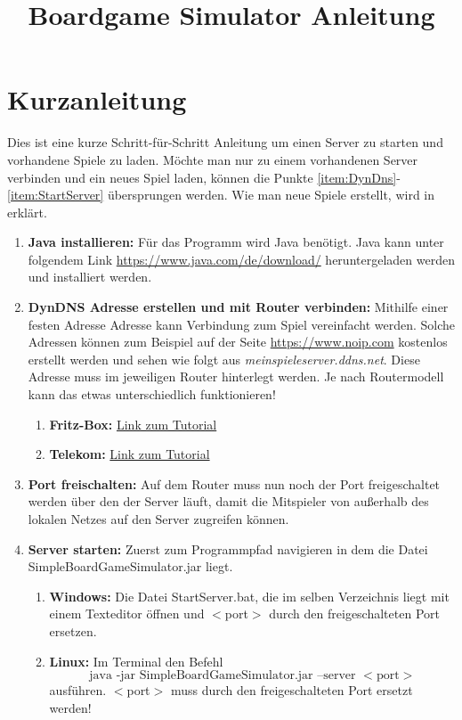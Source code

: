 \documentclass[ngerman]{scrbook}
\title{Boardgame Simulator Anleitung}
\begin{document}
	\maketitle
	\tableofcontents
	\chapter{Kurzanleitung}
	
	Dies ist eine kurze Schritt-für-Schritt Anleitung um einen Server zu starten und vorhandene Spiele zu laden. Möchte man nur zu einem vorhandenen Server verbinden und ein neues Spiel laden, können die Punkte \ref{item:DynDns}-\ref{item:StartServer} übersprungen werden. Wie man neue Spiele erstellt, wird in  erklärt.
	
	\begin{enumerate}[label=\arabic*)]
		\item \textbf{Java installieren:} Für das Programm wird Java benötigt. Java kann unter folgendem Link \href{https://www.java.com/de/download/}{https://www.java.com/de/download/} heruntergeladen werden und installiert werden.
		
		\item \label{item:DynDns} \textbf{DynDNS Adresse erstellen und mit Router verbinden:} Mithilfe einer festen Adresse Adresse kann Verbindung zum Spiel vereinfacht werden. Solche Adressen können zum Beispiel auf der Seite \href{https://www.noip.com}{https://www.noip.com} kostenlos erstellt werden und sehen wie folgt aus \textit{meinspieleserver.ddns.net}. Diese Adresse muss im jeweiligen Router hinterlegt werden. Je nach Routermodell kann das etwas unterschiedlich funktionieren!
		\begin{enumerate}
			\item \textbf{Fritz-Box:} \href{https://avm.de/service/fritzbox/fritzbox-7590/wissensdatenbank/publication/show/30_Dynamic-DNS-in-FRITZ-Box-einrichten/}{Link zum Tutorial} 
			\item \textbf{Telekom:} \href{https://www.netzwelt.de/news/95517-anleitung-dyndns-speedport-routern-einrichten.html}{Link zum Tutorial}
		\end{enumerate}
		
		\item \textbf{Port freischalten:} Auf dem Router muss nun noch der Port freigeschaltet werden über den der Server läuft, damit die Mitspieler von außerhalb des lokalen Netzes auf den Server zugreifen können.
		
		\item \label{item:StartServer} \textbf{Server starten:} 
			Zuerst zum Programmpfad navigieren  in dem die Datei SimpleBoardGameSimulator.jar liegt.
		\begin{enumerate}
			\item \textbf{Windows:} Die Datei StartServer.bat, die im selben Verzeichnis liegt mit einem Texteditor öffnen und $<$port$>$ durch den freigeschalteten Port ersetzen.
			\item \textbf{Linux:} Im Terminal den Befehl 
			$$\mbox{java -jar SimpleBoardGameSimulator.jar --server $<$port$>$}$$ ausführen. $<$port$>$ muss durch den freigeschalteten Port ersetzt werden!
		\end{enumerate}
		

\end{enumerate}
\end{document}
